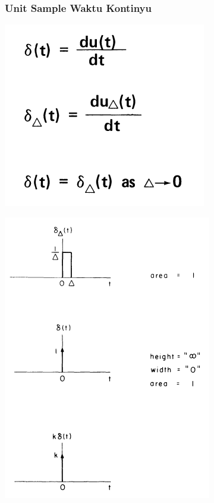 \documentclass[pdflatex,compress]{beamer}
\begin{document}
\begin{frame}
	\frametitle{Unit Sample Waktu Kontinyu}
	\begin{multicols}{2}
		\begin{center}
			\includegraphics[width=0.7\linewidth]{img/img004}
		\end{center}
	\columnbreak
		\begin{center}
			\includegraphics[width=0.9\linewidth]{img/img005}
		\end{center}
	\end{multicols}
\end{frame}
\end{document}
